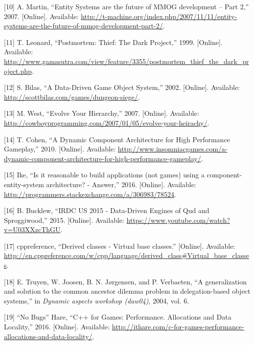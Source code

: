 \documentclass[oneside, 12pt, a4paper, openany]{book}
\begin{document}
\hypertarget{ref-tmachine_esmmogfuturep2_2007}{}
{[}10{]} A. Martin, ``Entity Systems are the future of MMOG development
-- Part 2,'' 2007. {[}Online{]}. Available:
\url{http://t-machine.org/index.php/2007/11/11/entity-systems-are-the-future-of-mmog-development-part-2/}.

\hypertarget{ref-tomleonard_thiefpostmortem_1999}{}
{[}11{]} T. Leonard, ``Postmortem: Thief: The Dark Project,'' 1999.
{[}Online{]}. Available:
\url{http://www.gamasutra.com/view/feature/3355/postmortem_thief_the_dark_project.php}.

\hypertarget{ref-scottbilas_dungeonsiege_2002}{}
{[}12{]} S. Bilas, ``A Data-Driven Game Object System,'' 2002.
{[}Online{]}. Available:
\url{http://scottbilas.com/games/dungeon-siege/}.

\hypertarget{ref-mickwest_evolveyourhierarchy_2007}{}
{[}13{]} M. West, ``Evolve Your Hierarchy,'' 2007. {[}Online{]}.
Available:
\url{http://cowboyprogramming.com/2007/01/05/evolve-your-heirachy/}.

\hypertarget{ref-terrancecohen_dynamiccomparchitecture_2010}{}
{[}14{]} T. Cohen, ``A Dynamic Component Architecture for High
Performance Gameplay,'' 2010. {[}Online{]}. Available:
\url{http://www.insomniacgames.com/a-dynamic-component-architecture-for-high-performance-gameplay/}.

\hypertarget{ref-stackexchange_ixe_answer}{}
{[}15{]} Ike, ``Is it reasonable to build applications (not games) using
a component-entity-system architecture? - Answer,'' 2016. {[}Online{]}.
Available: \url{http://programmers.stackexchange.com/a/306983/78524}.

\hypertarget{ref-sproggiwood_irdc_2015_talk}{}
{[}16{]} B. Bucklew, ``IRDC US 2015 - Data-Driven Engines of Qud and
Sproggiwood,'' 2015. {[}Online{]}. Available:
\url{https://www.youtube.com/watch?v=U03XXzcThGU}.

\hypertarget{ref-cppreference_virtual_base_classes}{}
{[}17{]} cppreference, ``Derived classes - Virtual base classes.''
{[}Online{]}. Available:
\url{http://en.cppreference.com/w/cpp/language/derived_class\#Virtual_base_classes}.

\hypertarget{ref-truyen2004generalization}{}
{[}18{]} E. Truyen, W. Joosen, B. N. Jørgensen, and P. Verbaeten, ``A
generalization and solution to the common ancestor dilemma problem in
delegation-based object systems,'' in \emph{Dynamic aspects workshop
(daw04)}, 2004, vol. 6.

\hypertarget{ref-ithare_allocations}{}
{[}19{]} ``No Bugs'' Hare, ``C++ for Games: Performance. Allocations and
Data Locality,'' 2016. {[}Online{]}. Available:
\url{http://ithare.com/c-for-games-performance-allocations-and-data-locality/}.
\end{document}
